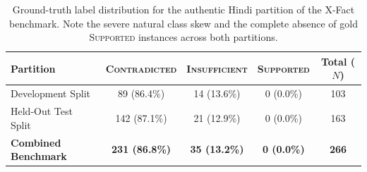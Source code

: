 \begin{table}[t]
\centering
\small
\caption{Ground-truth label distribution for the authentic Hindi partition of the X-Fact benchmark. Note the severe natural class skew and the complete absence of gold \textsc{Supported} instances across both partitions.}
\label{tab:dataset_distribution}
\begin{tabular}{lcccc}
\toprule
\textbf{Partition} & \textbf{\textsc{Contradicted}} & \textbf{\textsc{Insufficient}} & \textbf{\textsc{Supported}} & \textbf{Total ($N$)} \\
\midrule
Development Split & 89 (86.4\%) & 14 (13.6\%) & 0 (0.0\%) & 103 \\
Held-Out Test Split & 142 (87.1\%) & 21 (12.9\%) & 0 (0.0\%) & 163 \\
\midrule
\textbf{Combined Benchmark} & \textbf{231 (86.8\%)} & \textbf{35 (13.2\%)} & \textbf{0 (0.0\%)} & \textbf{266} \\
\bottomrule
\end{tabular}
\end{table}
